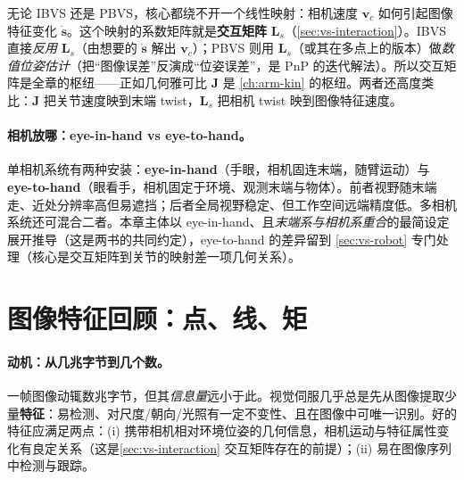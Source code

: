 \begin{insight}[一个矩阵把两条主线连起来]
无论 IBVS 还是 PBVS，核心都绕不开一个线性映射：相机速度 $\mathbf{v}_c$ 如何引起图像特征变化 $\dot{\mathbf{s}}$。这个映射的系数矩阵就是\textbf{交互矩阵} $\mathbf{L}_s$（\cref{sec:vs-interaction}）。IBVS 直接\emph{反用} $\mathbf{L}_s$（由想要的 $\dot{\mathbf{s}}$ 解出 $\mathbf{v}_c$）；PBVS 则用 $\mathbf{L}_s$（或其在多点上的版本）做\emph{数值位姿估计}（把“图像误差”反演成“位姿误差”，是 PnP 的迭代解法）。所以交互矩阵是全章的枢纽——正如几何雅可比 $\mathbf{J}$ 是 \cref{ch:arm-kin} 的枢纽。两者还高度类比：$\mathbf{J}$ 把关节速度映到末端 twist，$\mathbf{L}_s$ 把相机 twist 映到图像特征速度。
\end{insight}

\paragraph{相机放哪：eye-in-hand vs eye-to-hand。}
单相机系统有两种安装\cite{siciliano2009robotics}：\textbf{eye-in-hand}（手眼，相机固连末端，随臂运动）与 \textbf{eye-to-hand}（眼看手，相机固定于环境、观测末端与物体）。前者视野随末端走、近处分辨率高但易遮挡；后者全局视野稳定、但工作空间远端精度低。多相机系统还可混合二者。本章主体以 eye-in-hand、且\emph{末端系与相机系重合}的最简设定展开推导（这是两书的共同约定），eye-to-hand 的差异留到 \cref{sec:vs-robot} 专门处理（核心是交互矩阵到关节的映射差一项几何关系）。

\section{图像特征回顾：点、线、矩}
\label{sec:vs-features}

\paragraph{动机：从几兆字节到几个数。}
一帧图像动辄数兆字节，但其\emph{信息量}远小于此。视觉伺服几乎总是先从图像提取少量\textbf{特征}：易检测、对尺度/朝向/光照有一定不变性、且在图像中可唯一识别\cite{spong2006robot}。好的特征应满足两点\cite{spong2006robot}：(i) 携带相机相对环境位姿的几何信息，相机运动与特征属性变化有良定关系（这是\cref{sec:vs-interaction} 交互矩阵存在的前提）；(ii) 易在图像序列中检测与跟踪。

